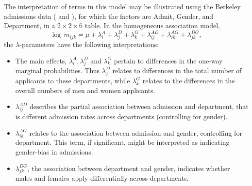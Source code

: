 The interpretation of terms in this model may be illustrated
using the Berkeley admissions data ( and ), for which the factors are Admit,
 Gender, and Department, in a $2 \times 2 \times 6$ table.
In the homogeneous association model,
\begin{equation}\label{eq:berk1}
  \log \,  m_{ijk}  =
  \mu  +  \lambda_i^A
  +  \lambda_j^D
  +  \lambda_k^G
  +  \lambda_{ij}^{AD}
  +  \lambda_{ik}^{AG}
  +  \lambda_{jk}^{DG}
  \comma
\end{equation}
the $\lambda$-parameters have the following interpretations:
\begin{itemize}
\item The main effects, $\lambda_i^A , \lambda_j^D$ and $\lambda_k^G$
   pertain to differences in the one-way marginal probabilities.
    Thus $\lambda_j^D$ relates to differences in the total number of applicants
    to these departments, while $\lambda_k^G$ relates to the differences
    in the overall numbers of men and women applicants.
\item $\lambda_{ij}^{AD}$ describes the partial association between
   admission and department, that is  different admission rates across
   departments (controlling for gender).
\item $\lambda_{ik}^{AG}$ relates to the association between
   admission and gender, controlling for department.
    This term, if significant, might be interpreted as indicating
   gender-bias in admissions.
\item $\lambda_{jk}^{DG}$, the association between
 department and gender, indicates whether males and females apply
 differentially across departments.
\end{itemize}

